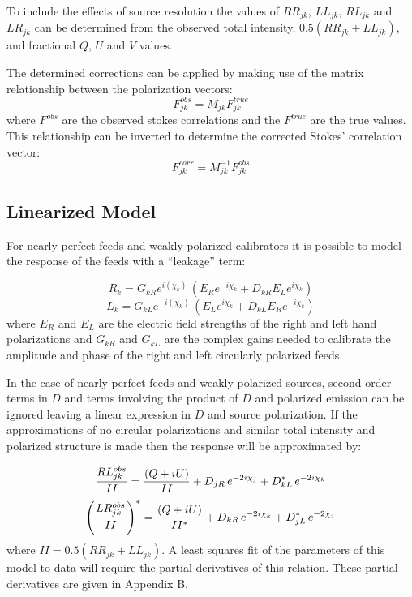    To include the effects of source resolution the values of
$RR_{jk}$, $LL_{jk}$, $RL_{jk}$ and $LR_{jk}$ can be determined from
the observed total intensity, $0.5(RR_{jk}+LL_{jk})$, and fractional
$Q$, $U$ and $V$ values.

   The determined corrections can be applied by making use of the
matrix relationship between the polarization vectors: $$ F^{obs}_{jk}
= M_{jk} F^{true}_{jk}$$ where $F^{obs}$ are the observed stokes
correlations and the $F^{true}$ are the true values.  This
relationship can be inverted to determine the corrected Stokes'
correlation vector: $$ F^{corr}_{jk} = M_{jk}^{-1} F^{obs}_{jk}$$



\subsection {Linearized Model}

   For nearly perfect feeds and weakly polarized calibrators it is
possible to model the response of the feeds with a ``leakage'' term:


$$ R_{k} = G_{kR} e^{i(\chi_k)}\, (E_{R} e^{-i \chi_k} + D_{kR} E_L
e^{i \chi_k}) $$
$$ L_{k} = G_{kL} e^{-i(\chi_k)}\, (E_{L} e^{i
\chi_k} + D_{kL} E_R e^{-i \chi_k}) $$
where $E_R$ and $E_L$ are the electric field strengths of the right
and left hand polarizations and $G_{kR}$ and $G_{kL}$ are the complex
gains needed to calibrate the amplitude and phase of the right and
left circularly polarized feeds.

   In the case of nearly perfect feeds and weakly polarized sources,
second
order terms in $D$ and terms involving the product of $D$ and
polarized emission can be ignored leaving a linear expression in $D$
and source polarization.  If the approximations of no circular
polarizations and similar total intensity and polarized structure is
made then the response will be approximated by:

%
%
$$ {RL^{obs}_{jk}\over {II}} = {(Q + iU)\over {II}} + D_{jR} \,
e^{-2i\chi_j} + D^*_{kL}\, e^{-2i\chi_k}$$
$$ \left({LR^{obs}_{jk}\over {II}}\right)^* = {(Q + iU)\over{II^*}} +
D_{kR} \, e^{-2i\chi_k} + D^*_{jL}\, e^{-2\chi_j}$$
where $II = 0.5(RR_{jk}+LL_{jk})$.
A least squares fit of the parameters of this model to data will
require the partial derivatives of this relation.  These partial
derivatives are given in Appendix B.

